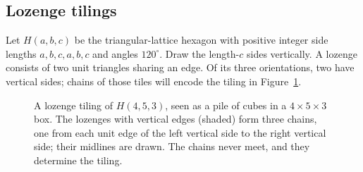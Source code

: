 \subsection*{Lozenge tilings}

Let $H(a,b,c)$ be the triangular-lattice hexagon with positive integer side lengths $a,b,c,a,b,c$ and angles $120^\circ$. Draw the length-$c$ sides vertically. A lozenge consists of two unit triangles sharing an edge. Of its three orientations, two have vertical sides; chains of those tiles will encode the tiling in Figure~\ref{linear:fig:lozenge}.
\begin{figure}[ht]
\centering
{}
\caption{A lozenge tiling of $H(4,5,3)$, seen as a pile of cubes in a $4\times5\times3$ box. The lozenges with vertical
edges (shaded) form three chains, one from each unit edge of the left vertical side to the right vertical side; their
midlines are drawn. The chains never meet, and they determine the tiling.}
\label{linear:fig:lozenge}
\end{figure}

